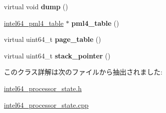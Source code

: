 \begin{DoxyCompactItemize}
\item 
\hypertarget{classintel64__processor__state_a90cb70a141b5f589991fdf6af0c3530e}{}virtual void {\bfseries dump} ()\label{classintel64__processor__state_a90cb70a141b5f589991fdf6af0c3530e}

\item 
\hypertarget{classintel64__processor__state_add5331bf8055914de6d6e83f8c40ea6b}{}\hyperlink{classintel64__pml4__table}{intel64\+\_\+pml4\+\_\+table} $\ast$ {\bfseries pml4\+\_\+table} ()\label{classintel64__processor__state_add5331bf8055914de6d6e83f8c40ea6b}

\item 
\hypertarget{classintel64__processor__state_a6a9393a7006e9b054b14021b6d609ea2}{}virtual uint64\+\_\+t {\bfseries page\+\_\+table} ()\label{classintel64__processor__state_a6a9393a7006e9b054b14021b6d609ea2}

\item 
\hypertarget{classintel64__processor__state_ab2dbf53bc4ad5e495e958013b57bc648}{}virtual uint64\+\_\+t {\bfseries stack\+\_\+pointer} ()\label{classintel64__processor__state_ab2dbf53bc4ad5e495e958013b57bc648}

\end{DoxyCompactItemize}


このクラス詳解は次のファイルから抽出されました\+:\begin{DoxyCompactItemize}
\item 
\hyperlink{intel64__processor__state_8h}{intel64\+\_\+processor\+\_\+state.\+h}\item 
\hyperlink{intel64__processor__state_8cpp}{intel64\+\_\+processor\+\_\+state.\+cpp}\end{DoxyCompactItemize}
